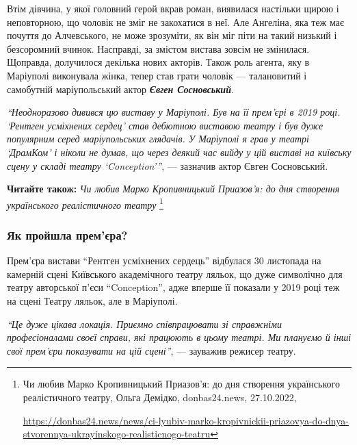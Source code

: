 
Втім дівчина, у якої головний герой вкрав роман, виявилася настільки щирою і
неповторною, що чоловік не зміг не закохатися в неї. Але Ангеліна, яка теж має
почуття до Алчевського, не може зрозуміти, як він міг піти на такий низький і
безсоромний вчинок. Насправді, за змістом вистава зовсім не змінилася.
Щоправда, долучилося декілька нових акторів. Також роль агента, яку в Маріуполі
виконувала жінка, тепер став грати чоловік — талановитий і самобутній
маріупольський актор \emph{\textbf{Євген Сосновський}}.

\begin{leftbar}
  \begingroup
{\em\enquote{Неодноразово дивився цю виставу у Маріуполі. Був на її прем'єрі в 2019
році. \enquote{Рентген усміхнених сердец} став дебютною виставою театру і був
дуже популярним серед маріупольських глядачів. У Маріуполі я грав у
театрі \enquote{ДрамКом} і ніколи не думав, що через деякий час вийду у цій
виставі на київську сцену у складі театру \enquote{Conception}}}, — зазначив
актор Євген Сосновський.
  \endgroup
\end{leftbar}

\textbf{Читайте також:} \emph{Чи любив Марко Кропивницький Приазов'я: до дня створення українського реалістичного театру}%
\footnote{Чи любив Марко Кропивницький Приазов'я: до дня створення українського реалістичного театру, Ольга Демідко, %
donbas24.news, 27.10.2022, \par%
\url{https://donbas24.news/news/ci-lyubiv-marko-kropivnickii-priazovya-do-dnya-stvorennya-ukrayinskogo-realisticnogo-teatru}%
}

\subsubsection{Як пройшла прем'єра?}

Прем'єра вистави \enquote{Рентген усміхнених сердець} відбулася 30 листопада на
камерній сцені Київського академічного театру ляльок, що дуже символічно для
театру авторської п'єси \enquote{Conception}, адже вперше її показали у 2019 році теж
на сцені Театру ляльок, але в Маріуполі.

\begin{leftbar}
  \begingroup
\emph{\enquote{Це дуже цікава локація. Приємно співпрацювати зі справжніми професіоналами
своєї справи, які працюють в цьому театрі. Ми плануємо й інші свої
прем'єри показувати на цій сцені}}, — зауважив режисер театру.
  \endgroup
\end{leftbar}

